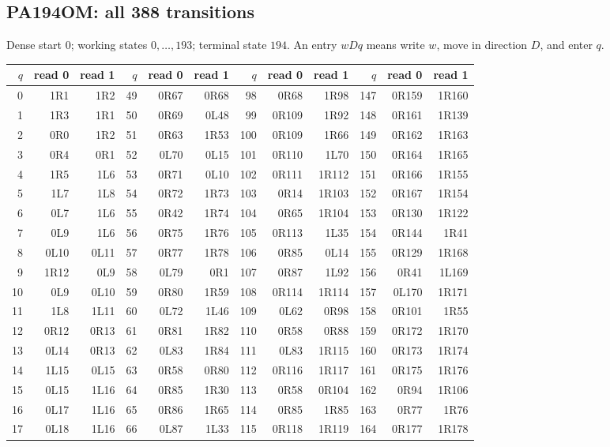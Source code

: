 \subsection{PA194OM: all 388 transitions}
\label{tab:PA194OM}
Dense start $0$; working states $0,\ldots,193$; terminal state $194$.
An entry $wDq$ means write $w$, move in direction $D$, and enter $q$.
\begin{center}\footnotesize\ttfamily
\setlength{\tabcolsep}{6pt}
\renewcommand{\arraystretch}{0.90}
\begin{tabular}{rrr@{\hspace{12pt}}rrr@{\hspace{12pt}}rrr@{\hspace{12pt}}rrr}
\toprule
$q$&read 0&read 1&$q$&read 0&read 1&$q$&read 0&read 1&$q$&read 0&read 1\\
\midrule
0&1R1&1R2&49&0R67&0R68&98&0R68&1R98&147&0R159&1R160\\
1&1R3&1R1&50&0R69&0L48&99&0R109&1R92&148&0R161&1R139\\
2&0R0&1R2&51&0R63&1R53&100&0R109&1R66&149&0R162&1R163\\
3&0R4&0R1&52&0L70&0L15&101&0R110&1L70&150&0R164&1R165\\
4&1R5&1L6&53&0R71&0L10&102&0R111&1R112&151&0R166&1R155\\
5&1L7&1L8&54&0R72&1R73&103&0R14&1R103&152&0R167&1R154\\
6&0L7&1L6&55&0R42&1R74&104&0R65&1R104&153&0R130&1R122\\
7&0L9&1L6&56&0R75&1R76&105&0R113&1L35&154&0R144&1R41\\
8&0L10&0L11&57&0R77&1R78&106&0R85&0L14&155&0R129&1R168\\
9&1R12&0L9&58&0L79&0R1&107&0R87&1L92&156&0R41&1L169\\
10&0L9&0L10&59&0R80&1R59&108&0R114&1R114&157&0L170&1R171\\
11&1L8&1L11&60&0L72&1L46&109&0L62&0R98&158&0R101&1R55\\
12&0R12&0R13&61&0R81&1R82&110&0R58&0R88&159&0R172&1R170\\
13&0L14&0R13&62&0L83&1R84&111&0L83&1R115&160&0R173&1R174\\
14&1L15&0L15&63&0R58&0R80&112&0R116&1R117&161&0R175&1R176\\
15&0L15&1L16&64&0R85&1R30&113&0R58&0R104&162&0R94&1R106\\
16&0L17&1L16&65&0R86&1R65&114&0R85&1R85&163&0R77&1R76\\
17&0L18&1L16&66&0L87&1L33&115&0R118&1R119&164&0R177&1R178\\

\end{tabular}
\end{center}
